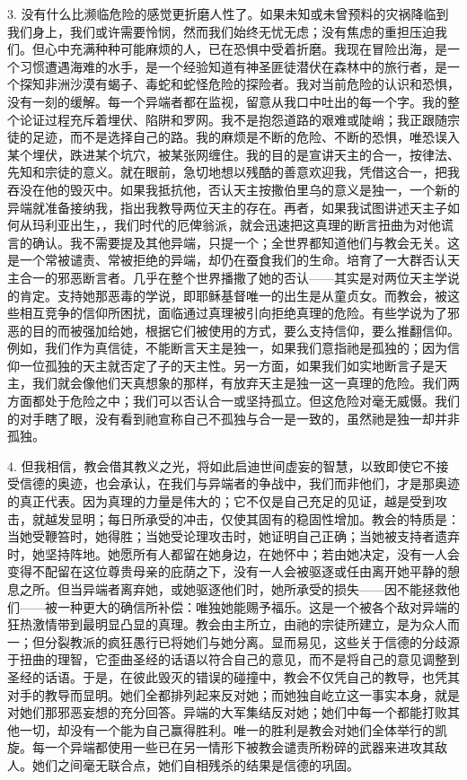 3. 没有什么比濒临危险的感觉更折磨人性了。如果未知或未曾预料的灾祸降临到我们身上，我们或许需要怜悯，然而我们始终无忧无虑；没有焦虑的重担压迫我们。但心中充满种种可能麻烦的人，已在恐惧中受着折磨。我现在冒险出海，是一个习惯遭遇海难的水手，是一个经验知道有神圣匪徒潜伏在森林中的旅行者，是一个探知非洲沙漠有蝎子、毒蛇和蛇怪危险的探险者。我对当前危险的认识和恐惧，没有一刻的缓解。每一个异端者都在监视，留意从我口中吐出的每一个字。我的整个论证过程充斥着埋伏、陷阱和罗网。我不是抱怨道路的艰难或陡峭；我正跟随宗徒的足迹，而不是选择自己的路。我的麻烦是不断的危险、不断的恐惧，唯恐误入某个埋伏，跌进某个坑穴，被某张网缠住。我的目的是宣讲天主的合一，按律法、先知和宗徒的意义。就在眼前，急切地想以残酷的善意欢迎我，凭借这合一，把我吞没在他的毁灭中。如果我抵抗他，否认天主按撒伯里乌的意义是独一，一个新的异端就准备接纳我，指出我教导两位天主的存在。再者，如果我试图讲述天主子如何从玛利亚出生，，我们时代的厄俾翁派，就会迅速把这真理的断言扭曲为对他谎言的确认。我不需要提及其他异端，只提一个；全世界都知道他们与教会无关。这是一个常被谴责、常被拒绝的异端，却仍在蚕食我们的生命。培育了一大群否认天主合一的邪恶断言者。几乎在整个世界播撒了她的否认——其实是对两位天主学说的肯定。支持她那恶毒的学说，即耶稣基督唯一的出生是从童贞女。而教会，被这些相互竞争的信仰所困扰，面临通过真理被引向拒绝真理的危险。有些学说为了邪恶的目的而被强加给她，根据它们被使用的方式，要么支持信仰，要么推翻信仰。例如，我们作为真信徒，不能断言天主是独一，如果我们意指祂是孤独的；因为信仰一位孤独的天主就否定了子的天主性。另一方面，如果我们如实地断言子是天主，我们就会像他们天真想象的那样，有放弃天主是独一这一真理的危险。我们两方面都处于危险之中；我们可以否认合一或坚持孤立。但这危险对毫无威慑。我们的对手瞎了眼，没有看到祂宣称自己不孤独与合一是一致的，虽然祂是独一却并非孤独。\par

4. 但我相信，教会借其教义之光，将如此启迪世间虚妄的智慧，以致即使它不接受信德的奥迹，也会承认，在我们与异端者的争战中，我们而非他们，才是那奥迹的真正代表。因为真理的力量是伟大的；它不仅是自己充足的见证，越是受到攻击，就越发显明；每日所承受的冲击，仅使其固有的稳固性增加。教会的特质是：当她受鞭笞时，她得胜；当她受论理攻击时，她证明自己正确；当她被支持者遗弃时，她坚持阵地。她愿所有人都留在她身边，在她怀中；若由她决定，没有一人会变得不配留在这位尊贵母亲的庇荫之下，没有一人会被驱逐或任由离开她平静的憩息之所。但当异端者离弃她，或她驱逐他们时，她所承受的损失——因不能拯救他们——被一种更大的确信所补偿：唯独她能赐予福乐。这是一个被各个敌对异端的狂热激情带到最明显凸显的真理。教会由主所立，由祂的宗徒所建立，是为众人而一；但分裂教派的疯狂愚行已将她们与她分离。显而易见，这些关于信德的分歧源于扭曲的理智，它歪曲圣经的话语以符合自己的意见，而不是将自己的意见调整到圣经的话语。于是，在彼此毁灭的错误的碰撞中，教会不仅凭自己的教导，也凭其对手的教导而显明。她们全都排列起来反对她；而她独自屹立这一事实本身，就是对她们那邪恶妄想的充分回答。异端的大军集结反对她；她们中每一个都能打败其他一切，却没有一个能为自己赢得胜利。唯一的胜利是教会对她们全体举行的凯旋。每一个异端都使用一些已在另一情形下被教会谴责所粉碎的武器来进攻其敌人。她们之间毫无联合点，她们自相残杀的结果是信德的巩固。\par

